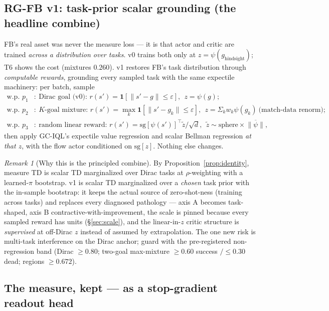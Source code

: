 \documentclass[11pt]{article}
\newcommand{\sg}{\mathrm{sg}}
\theoremstyle{definition}
\theoremstyle{remark}
\newtheorem{remark}{Remark}
\begin{document}
\subsection{RG-FB v1: task-prior scalar grounding (the headline combine)}
\label{sec:v1}

FB's real asset was never the measure loss --- it is that actor and critic are trained
\emph{across a distribution over tasks}. v0 trains both only at $z=\psi(g_{\mathrm{hindsight}})$;
T6 shows the cost (mixtures $0.260$). v1 restores FB's task distribution through
\emph{computable rewards}, grounding every sampled task with the same expectile machinery:
per batch, sample
\begin{align}
\text{w.p. } p_1&:\ \text{Dirac goal (v0): } r(s')=\mathbf 1[\|s'-g\|\le\varepsilon],\ \ z=\psi(g);\nonumber\\
\text{w.p. } p_2&:\ \text{$K$-goal mixture: } r(s')=\max_k \mathbf 1[\|s'-g_k\|\le\varepsilon],\ \
z=\Sigma_k w_k\psi(g_k)\ \text{(match-data renorm)};\label{eq:taskprior}\\
\text{w.p. } p_3&:\ \text{random linear reward: } r(s')=\sg[\psi(s')]^\top\tilde z/\sqrt d,\ \
\tilde z\sim\text{sphere}\times\overline{\|\psi\|},\nonumber
\end{align}
then apply GC-IQL's expectile value regression and scalar Bellman regression \emph{at that
$z$}, with the flow actor conditioned on $\sg[z]$. Nothing else changes.

\begin{remark}[Why this is the principled combine]
By Proposition~\ref{prop:identity}, measure TD is scalar TD marginalized over Dirac tasks at
$\rho$-weighting with a learned-$\pi$ bootstrap. v1 is scalar TD marginalized over a
\emph{chosen} task prior with the in-sample bootstrap: it keeps the actual source of
zero-shot-ness (training across tasks) and replaces every diagnosed pathology --- axis A
becomes task-shaped, axis B contractive-with-improvement, the scale is pinned because every
sampled reward has units (\S\ref{sec:scale}), and the linear-in-$z$ critic structure is
\emph{supervised} at off-Dirac $z$ instead of assumed by extrapolation. The one new risk is
multi-task interference on the Dirac anchor; guard with the pre-registered non-regression
band (Dirac $\ge0.80$; two-goal max-mixture $\ge0.60$ success $/\le0.30$ dead; regions
$\ge0.672$).
\end{remark}

\subsection{The measure, kept --- as a stop-gradient readout head}
\label{sec:sghead}
\end{document}

